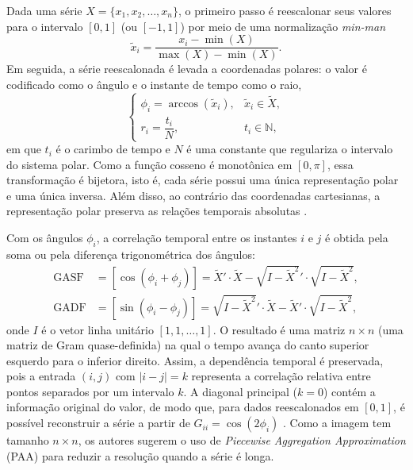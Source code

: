 Dada uma série $X = \{x_1, x_2, \dots, x_n\}$, o primeiro passo é reescalonar seus valores para o intervalo $[0,1]$ (ou $[-1,1]$) por meio de uma normalização \textit{min-man}
\begin{equation}
\tilde{x}_i = \frac{x_i - \min(X)}{\max(X) - \min(X)}.
\label{eq:rescale}
\end{equation}
Em seguida, a série reescalonada é levada a coordenadas polares: o valor é codificado como o ângulo e o instante de tempo como o raio,
\begin{equation}
\begin{cases}
\phi_i = \arccos(\tilde{x}_i), & \tilde{x}_i \in \tilde{X},\\[2pt]
r_i = \dfrac{t_i}{N}, & t_i \in \mathbb{N},
\end{cases}
\label{eq:polar}
\end{equation}
em que $t_i$ é o carimbo de tempo e $N$ é uma constante que regulariza o intervalo do sistema polar. Como a função cosseno é monotônica em $[0,\pi]$, essa transformação é bijetora, isto é, cada série possui uma única representação polar e uma única inversa. Além disso, ao contrário das coordenadas cartesianas, a representação polar preserva as relações temporais absolutas \cite{wang2015imaging}.

Com os ângulos $\phi_i$, a correlação temporal entre os instantes $i$ e $j$ é obtida pela soma ou pela diferença trigonométrica dos ângulos:
\begin{align}
\mathrm{GASF} &= \left[\cos(\phi_i + \phi_j)\right] = \tilde{X}' \cdot \tilde{X} - \sqrt{I - \tilde{X}^2}' \cdot \sqrt{I - \tilde{X}^2}, \label{eq:gasf}\\
\mathrm{GADF} &= \left[\sin(\phi_i - \phi_j)\right] = \sqrt{I - \tilde{X}^2}' \cdot \tilde{X} - \tilde{X}' \cdot \sqrt{I - \tilde{X}^2}, \label{eq:gadf}
\end{align}
onde $I$ é o vetor linha unitário $[1,1,\dots,1]$. O resultado é uma matriz $n \times n$ (uma matriz de Gram quase-definida) na qual o tempo avança do canto superior esquerdo para o inferior direito. Assim, a dependência temporal é preservada, pois a entrada $(i,j)$ com $|i-j|=k$ representa a correlação relativa entre pontos separados por um intervalo $k$. A diagonal principal ($k=0$) contém a informação original do valor, de modo que, para dados reescalonados em $[0,1]$, é possível reconstruir a série a partir de $G_{ii} = \cos(2\phi_i)$ \cite{wang2015imaging}. Como a imagem tem tamanho $n \times n$, os autores sugerem o uso de \textit{Piecewise Aggregation Approximation} (PAA) para reduzir a resolução quando a série é longa.

